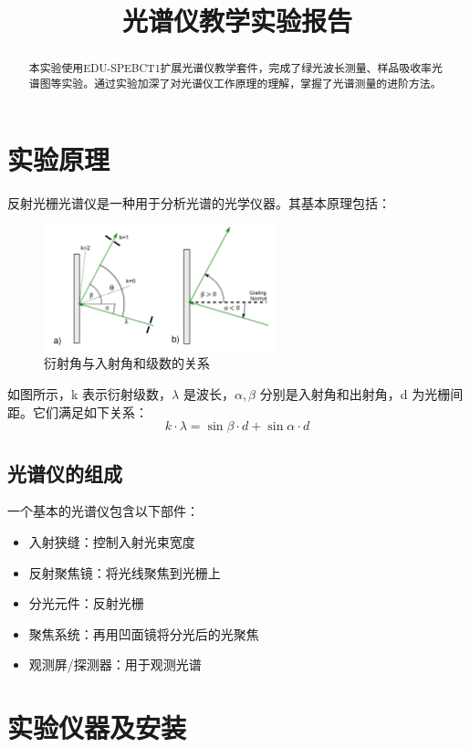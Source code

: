 \documentclass{ctexart}
\title{光谱仪教学实验报告}
\begin{document}
\maketitle

\begin{abstract}
本实验使用EDU-SPEBCT1扩展光谱仪教学套件，完成了绿光波长测量、样品吸收率光谱图等实验。通过实验加深了对光谱仪工作原理的理解，掌握了光谱测量的进阶方法。
\end{abstract}

\section{实验原理}

反射光栅光谱仪是一种用于分析光谱的光学仪器。其基本原理包括：
\begin{figure}[H]
    \centering
    \includegraphics[width=0.6\textwidth,height=0.3\textwidth]{pictures/原理图例.png}
    \caption{衍射角与入射角和级数的关系}
\end{figure}

如图所示，k 表示衍射级数，$\lambda$ 是波长，$\alpha,\beta$ 分别是入射角和出射角，d 为光栅间距。它们满足如下关系：
\[k\cdot\lambda=\sin\beta\cdot d+\sin\alpha\cdot d\]
\subsection{光谱仪的组成}
一个基本的光谱仪包含以下部件：
\begin{itemize}
    \item 入射狭缝：控制入射光束宽度
    \item 反射聚焦镜：将光线聚焦到光栅上
    \item 分光元件：反射光栅
    \item 聚焦系统：再用凹面镜将分光后的光聚焦
    \item 观测屏/探测器：用于观测光谱
\end{itemize}

\section{实验仪器及安装}
\end{document}
